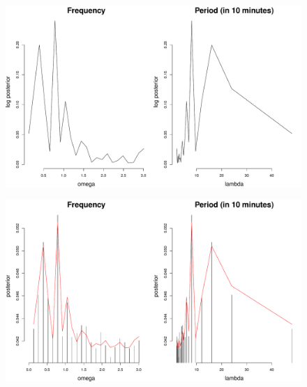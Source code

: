 \documentclass[12pt]{article}
\begin{document}
\begin{figure}[H]
\begin{center}
\includegraphics[scale=0.40]{fp_lh.pdf}
\end{center}
\end{figure}

\begin{figure}[H]
\begin{center}
\includegraphics[scale=0.40]{sp_lh.pdf}
\end{center}
\end{figure}
\end{document}

